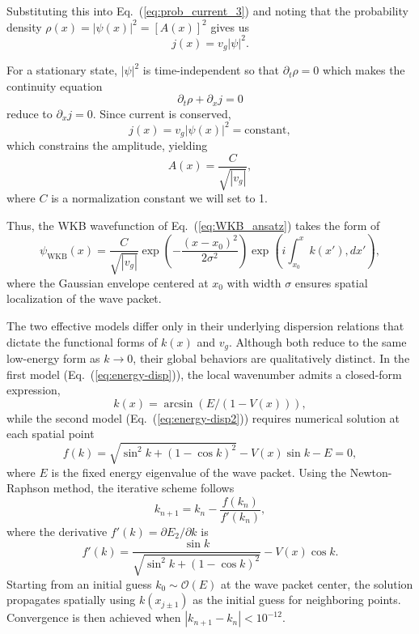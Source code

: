 \documentclass[%
 aip,
 amsmath,amssymb,
 reprint,%
]{revtex4-1}
\begin{document}
Substituting this into Eq.~(\ref{eq:prob_current_3}) and noting that the probability density $\rho(x) = |\psi(x)|^2 = [A(x)]^2$ gives us
\begin{equation}
j(x) = v_g|\psi|^2.
\end{equation}

For a stationary state, $|\psi|^2$ is time-independent so that $\partial_t \rho=0$ which makes the continuity equation 
\begin{equation}
\partial_t \rho + \partial_x j = 0
\end{equation}
reduce to $\partial_x j=0$. Since current is conserved,
\begin{equation}
j(x) = v_g |\psi(x)|^2 = \text{constant},
\end{equation}
which constrains the amplitude, yielding
\begin{equation}
A(x) = \frac{C}{\sqrt{|v_g|}},
\end{equation}
where $C$ is a normalization constant we will set to 1.

Thus, the WKB wavefunction of Eq.~(\ref{eq:WKB_ansatz}) takes the form of
\begin{equation}
\psi_{\mathrm{WKB}}(x) = \frac{C}{\sqrt{|v_g|}}\exp\left(-\frac{(x - x_0)^2}{2\sigma^2}\right)\exp\left(i \int_{x_0}^{x} k(x'), dx'\right),
\end{equation}
where the Gaussian envelope centered at $x_0$ with width $\sigma$ ensures spatial localization of the wave packet.

The two effective models differ only in their underlying dispersion relations that dictate the functional forms of $k(x)$ and $v_g$. Although both reduce to the same low-energy form as $k \rightarrow 0$, their global behaviors are qualitatively distinct. In the first model (Eq.~(\ref{eq:energy-disp})), the local wavenumber admits a closed-form expression,
\begin{equation}
k(x) = \arcsin(E / (1 - V(x))),
\end{equation}
while the second model (Eq.~(\ref{eq:energy-disp2})) requires numerical solution at each spatial point
\begin{equation}
f(k) = \sqrt{\sin^2 k + (1-\cos k)^2} - V(x)\sin k - E = 0,
\end{equation}
where $E$ is the fixed energy eigenvalue of the wave packet. Using the Newton-Raphson method, the iterative scheme follows
\begin{equation}
k_{n+1} = k_n - \frac{f(k_n)}{f'(k_n)},
\end{equation}
where the derivative $f'(k) = \partial E_2/\partial k$ is
\begin{equation}
f'(k) = \frac{\sin k}{\sqrt{\sin^2 k + (1-\cos k)^2}} - V(x)\cos k.
\end{equation}
Starting from an initial guess $k_0 \sim \mathcal{O}(E)$ at the wave packet center, the solution propagates spatially using $k(x_{j\pm1})$ as the initial guess for neighboring points. Convergence is then achieved when $|k_{n+1} - k_n| < 10^{-12}$.
\end{document}
